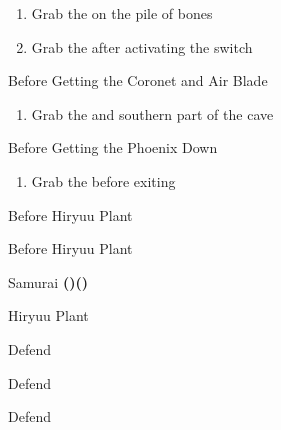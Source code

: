 \begin{paracol}{2}
\switchcolumn*
\begin{enumerate}[resume]
    \item Grab the  on the pile of bones
    \item Grab the  after activating the switch
\end{enumerate}

\switchcolumn
\begin{steproute}{Before Getting the Coronet and Air Blade}
\end{steproute}

\switchcolumn*
\begin{enumerate}[resume]
    \item Grab the  and  southern part of the cave
\end{enumerate}

\switchcolumn
\begin{steproute}{Before Getting the Phoenix Down}
\end{steproute}

\switchcolumn*
\begin{enumerate}[resume]
    \item Grab the  before exiting
\end{enumerate}

\switchcolumn
\begin{steproute}{Before Hiryuu Plant}
\end{steproute}

\switchcolumn
\begin{menu}{Before Hiryuu Plant}
    \varwb
    \begin{jobMenu}
        \bartz Samurai \textbf{(\pointLeft)(\pointDown)} \equip{\dancingDagger}
    \end{jobMenu}
    \varwe
\end{menu}

\begin{boss}{Hiryuu Plant}
    \varwb
    \begin{round}{1}
        \galuf Defend
        \faris \leftCommand{\gilToss}
        \bartz \leftCommand{\gilToss}
        \item {}
        \vspace{1mm}
        \item[] 
        \lenna Defend
    \end{round}
    \begin{round}{2}
        \galuf Defend
        \faris \leftCommand{\gilToss}
        \bartz \leftCommand{\gilToss}
    \end{round}
    \varwe
\end{boss}


\end{paracol}
